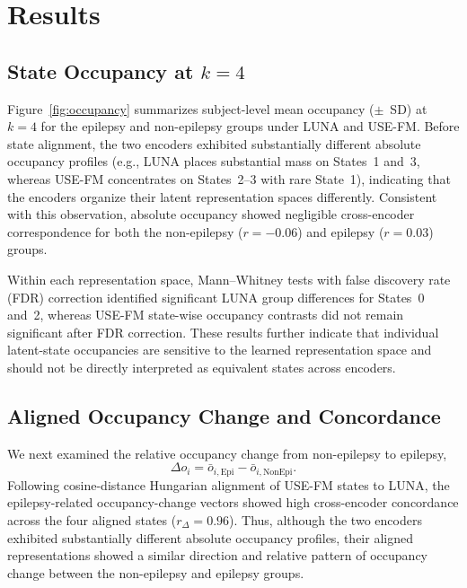
\section{Results}

\subsection{State Occupancy at $k=4$}

Figure~\ref{fig:occupancy} summarizes subject-level mean occupancy ($\pm$~SD)
at $k=4$ for the epilepsy and non-epilepsy groups under LUNA and USE-FM.
Before state alignment, the two encoders exhibited substantially different
absolute occupancy profiles (e.g., LUNA places substantial mass on States~1
and~3, whereas USE-FM concentrates on States~2--3 with rare State~1),
indicating that the encoders organize their latent representation spaces
differently. Consistent with this observation, absolute occupancy showed
negligible cross-encoder correspondence for both the non-epilepsy
($r=-0.06$) and epilepsy ($r=0.03$) groups.

Within each representation space, Mann--Whitney tests with false discovery
rate (FDR) correction identified significant LUNA group differences for
States~0 and~2, whereas USE-FM state-wise occupancy contrasts did not remain
significant after FDR correction. These results further indicate that
individual latent-state occupancies are sensitive to the learned representation
space and should not be directly interpreted as equivalent states across
encoders.


\subsection{Aligned Occupancy Change and Concordance}

We next examined the relative occupancy change from non-epilepsy to epilepsy,
\[
\Delta o_i
=
\bar{o}_{i,\mathrm{Epi}}
-
\bar{o}_{i,\mathrm{NonEpi}}.
\]
Following cosine-distance Hungarian alignment of USE-FM states to LUNA, the
epilepsy-related occupancy-change vectors showed high cross-encoder concordance
across the four aligned states ($r_{\Delta}=0.96$). Thus, although the two
encoders exhibited substantially different absolute occupancy profiles, their
aligned representations showed a similar direction and relative pattern of
occupancy change between the non-epilepsy and epilepsy groups.

